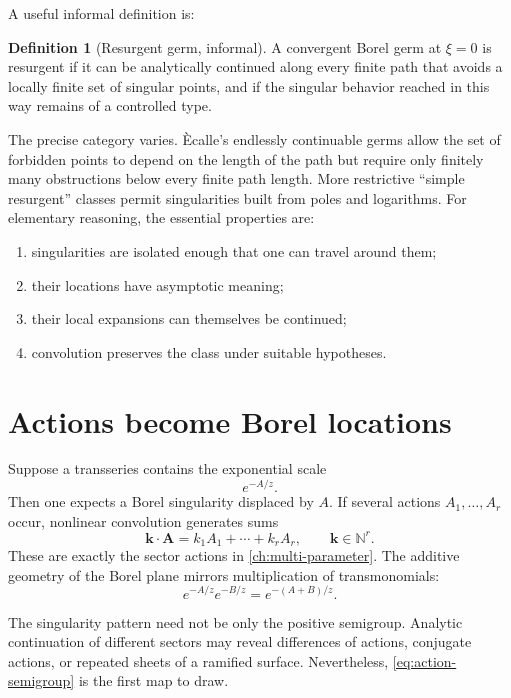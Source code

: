 \documentclass[11pt,openany]{book}
\theoremstyle{definition}
\newtheorem{definition}{Definition}[chapter]
\theoremstyle{plain}
\theoremstyle{remark}
\newcommand{\N}{\mathbb{N}}
\begin{document}
A useful informal definition is:

\begin{definition}[Resurgent germ, informal]
A convergent Borel germ at $\xi=0$ is resurgent if it can be analytically continued along every finite path that avoids a locally finite set of singular points, and if the singular behavior reached in this way remains of a controlled type.
\end{definition}

The precise category varies. \`Ecalle's endlessly continuable germs allow the set of forbidden points to depend on the length of the path but require only finitely many obstructions below every finite path length. More restrictive ``simple resurgent'' classes permit singularities built from poles and logarithms. For elementary reasoning, the essential properties are:
\begin{enumerate}
 \item singularities are isolated enough that one can travel around them;
 \item their locations have asymptotic meaning;
 \item their local expansions can themselves be continued;
 \item convolution preserves the class under suitable hypotheses.
\end{enumerate}

\section{Actions become Borel locations}

Suppose a transseries contains the exponential scale
\[
 e^{-A/z}.
\]
Then one expects a Borel singularity displaced by $A$. If several actions $A_1,\dots,A_r$ occur, nonlinear convolution generates sums
\begin{equation}\label{eq:action-semigroup}
 \mathbf k\cdot\mathbf A
 =k_1A_1+\cdots+k_rA_r,
 \qquad \mathbf k\in\N^r.
\end{equation}
These are exactly the sector actions in \cref{ch:multi-parameter}. The additive geometry of the Borel plane mirrors multiplication of transmonomials:
\[
 e^{-A/z}e^{-B/z}=e^{-(A+B)/z}.
\]

The singularity pattern need not be only the positive semigroup. Analytic continuation of different sectors may reveal differences of actions, conjugate actions, or repeated sheets of a ramified surface. Nevertheless, \eqref{eq:action-semigroup} is the first map to draw.
\end{document}
